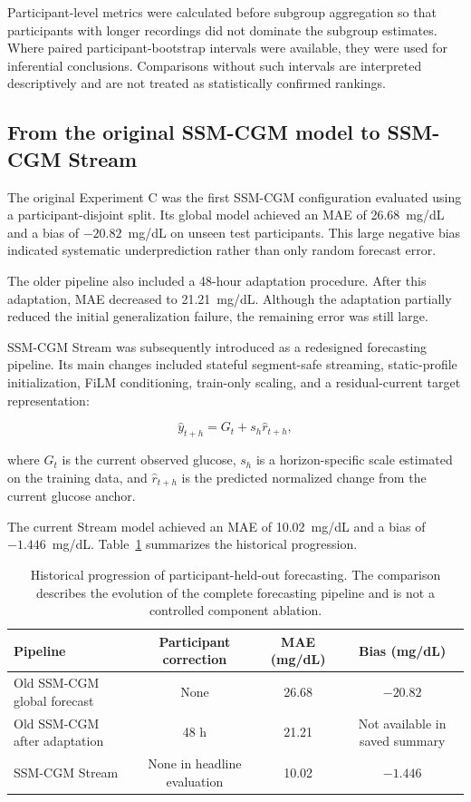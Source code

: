 Participant-level metrics were calculated before subgroup aggregation so that
participants with longer recordings did not dominate the subgroup estimates.
Where paired participant-bootstrap intervals were available, they were used for
inferential conclusions. Comparisons without such intervals are interpreted
descriptively and are not treated as statistically confirmed rankings.

\subsection{From the original SSM-CGM model to SSM-CGM Stream}
\label{subsec:historical_forecasting_progression}

The original Experiment C was the first SSM-CGM configuration evaluated using
a participant-disjoint split. Its global model achieved an MAE of
26.68~mg/dL and a bias of $-20.82$~mg/dL on unseen test participants. This
large negative bias indicated systematic underprediction rather than only
random forecast error.

The older pipeline also included a 48-hour adaptation procedure. After this
adaptation, MAE decreased to 21.21~mg/dL. Although the adaptation partially
reduced the initial generalization failure, the remaining error was still
large.

SSM-CGM Stream was subsequently introduced as a redesigned forecasting
pipeline. Its main changes included stateful segment-safe streaming,
static-profile initialization, FiLM conditioning, train-only scaling, and a
residual-current target representation:

\begin{equation}
\hat{y}_{t+h}
=
G_t+s_h\hat{r}_{t+h},
\end{equation}

where $G_t$ is the current observed glucose, $s_h$ is a horizon-specific scale
estimated on the training data, and $\hat{r}_{t+h}$ is the predicted normalized
change from the current glucose anchor.

The current Stream model achieved an MAE of 10.02~mg/dL and a bias of
$-1.446$~mg/dL. Table~\ref{tab:historical_forecasting_progression}
summarizes the historical progression.

\begin{table}[H]
\centering
\caption{Historical progression of participant-held-out forecasting. The
comparison describes the evolution of the complete forecasting pipeline and is
not a controlled component ablation.}
\label{tab:historical_forecasting_progression}
\begin{tabular}{lccc}
\toprule
Pipeline & Participant correction & MAE (mg/dL) & Bias (mg/dL) \\
\midrule
Old SSM-CGM global forecast
    & None
    & 26.68
    & $-20.82$ \\
Old SSM-CGM after adaptation
    & 48 h
    & 21.21
    & Not available in saved summary \\
SSM-CGM Stream
    & None in headline evaluation
    & 10.02
    & $-1.446$ \\
\bottomrule
\end{tabular}
\end{table}


